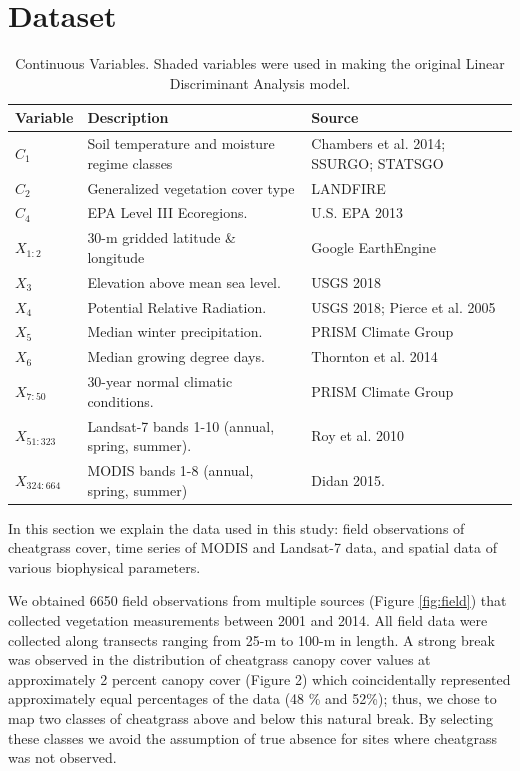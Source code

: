 \documentclass{article} %
\begin{document}
\section{Dataset}
\begin{table}
 \begin{tabularx}{\textwidth}{l |l| l}
\toprule[.2em]
{\bf Variable} &{\bf Description} &{\bf Source}\\
\midrule
$C_1$ & Soil temperature and moisture regime classes& Chambers et al. 2014; SSURGO; STATSGO\\
$C_2$ &Generalized vegetation cover type & LANDFIRE\\
$C_4$ & EPA Level III Ecoregions.& U.S. EPA 2013\\
$X_{1:2}$ & 30-m gridded latitude \& longitude & Google EarthEngine\\
$X_3$ & Elevation above mean sea level.& USGS 2018\\
$X_4$ & Potential Relative Radiation.& USGS 2018; Pierce et al. 2005 \\
$X_5$ & Median winter precipitation.& PRISM Climate Group\\
$X_6$ & Median growing degree days.& Thornton et al. 2014 \\
$X_{7:50}$ & 30-year normal climatic conditions.& PRISM Climate Group\\
$X_{51:323}$ & Landsat-7 bands 1-10 (annual, spring, summer). & Roy et al. 2010\\
$X_{324:664}$ & MODIS bands 1-8 (annual, spring, summer)& Didan 2015.\\
\bottomrule[.2em]
\end{tabularx}
\caption{Continuous Variables. Shaded variables were used in making the original Linear Discriminant Analysis model.} \label{tab:data}
\end{table}

In this section we explain the data used in this study: field observations of cheatgrass cover, time series of MODIS and Landsat-7 data, and spatial data of various biophysical parameters.

We obtained 6650 field observations from multiple sources (Figure \ref{fig:field}) that collected vegetation measurements between 2001 and 2014. All field data were collected along transects ranging from 25-m to 100-m in length. A strong break was observed in the distribution of cheatgrass canopy cover values at approximately 2 percent canopy cover (Figure 2) which coincidentally represented approximately equal percentages of the data (48 \% and 52\%); thus, we chose to map two classes of cheatgrass above and below this natural break. 
By selecting these classes we avoid the assumption of true absence for sites where cheatgrass was not observed.
\end{document}
